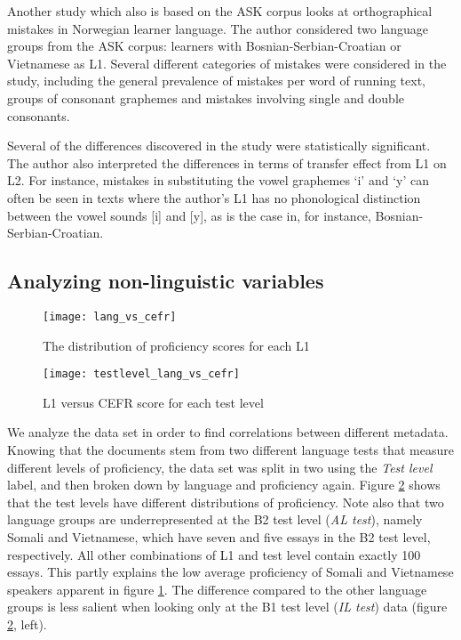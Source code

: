 Another study \autocite{vigrestad2016} which also is based on the ASK corpus
looks at orthographical mistakes in Norwegian learner language. The author
considered two language groups from the ASK corpus: learners with
Bosnian-Serbian-Croatian or Vietnamese as \ac{L1}. Several different
categories of mistakes were considered in the study, including the general
prevalence of mistakes per word of running text, groups of consonant
graphemes and mistakes involving single and double consonants.

Several of the differences discovered in the study were statistically
significant. The author also interpreted the differences in terms of transfer
effect from \ac{L1} on \ac{L2}. For instance, mistakes in substituting the
vowel graphemes `i' and `y' can often be seen in texts where the author's L1
has no phonological distinction between the vowel sounds [i] and [y], as is
the case in, for instance, Bosnian-Serbian-Croatian.


\subsection{Analyzing non-linguistic variables}

\begin{figure}
  \centering
  \texttt{[image: lang\_vs\_cefr]}
  \caption{The distribution of proficiency scores for each L1}
  \label{fig:lang-vs-cefr}
\end{figure}
 
\begin{figure}
  \centering
  \texttt{[image: testlevel\_lang\_vs\_cefr]}
  \caption{L1 versus CEFR score for each test level}
  \label{fig:testlevel-lang-vs-cefr}
\end{figure}

We analyze the data set in order to find correlations between different
metadata. Knowing that the documents stem from two different language tests
that measure different levels of proficiency, the data set was split in two
using the \emph{Test level} label, and then broken down by language and
proficiency again. Figure \ref{fig:testlevel-lang-vs-cefr} shows that the
test levels have different distributions of proficiency. Note also that two
language groups are underrepresented at the B2 test level (\emph{AL test}),
namely Somali and Vietnamese, which have seven and five essays in the B2 test
level, respectively. All other combinations of L1 and test level contain
exactly 100 essays. This partly explains the low average proficiency of
Somali and Vietnamese speakers apparent in figure \ref{fig:lang-vs-cefr}. The
difference compared to the other language groups is less salient when looking
only at the B1 test level (\emph{IL test}) data (figure
\ref{fig:testlevel-lang-vs-cefr}, left).

